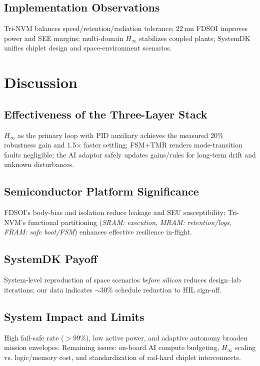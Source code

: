 \documentclass[conference]{IEEEtran}
\begin{document}
\subsection{Implementation Observations}
Tri-NVM balances speed/retention/radiation tolerance; 22\,nm FDSOI improves power
and SEE margins; multi-domain $H_\infty$ stabilizes coupled plants; SystemDK unifies
chiplet design and space-environment scenarios.

\section{Discussion}
\subsection{Effectiveness of the Three-Layer Stack}
$H_\infty$ as the primary loop with PID auxiliary achieves the measured 20\% robustness
gain and 1.5$\times$ faster settling; FSM+TMR renders mode-transition faults negligible;
the AI adaptor safely updates gains/rules for long-term drift and unknown disturbances.

\subsection{Semiconductor Platform Significance}
FDSOI’s body-bias and isolation reduce leakage and SEU susceptibility; Tri-NVM’s
functional partitioning (\emph{SRAM: execution}, \emph{MRAM: retention/logs},
\emph{FRAM: safe boot/FSM}) enhances effective resilience in-flight.

\subsection{SystemDK Payoff}
System-level reproduction of space scenarios \emph{before silicon} reduces design--lab
iterations; our data indicates $\sim$30\% schedule reduction to HIL sign-off.

\subsection{System Impact and Limits}
High fail-safe rate ($>\!99\%$), low active power, and adaptive autonomy broaden
mission envelopes. Remaining issues: on-board AI compute budgeting, $H_\infty$
scaling vs. logic/memory cost, and standardization of rad-hard chiplet interconnects.
\end{document}
